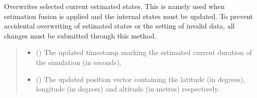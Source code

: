 \documentclass[letterpaper,10pt,english]{sphinxmanual}
\begin{document}
\begin{fulllineitems}
\begin{fulllineitems}
\label{\detokenize{modules/estimation/state:qnav.estimation.state.EstimatedState.update_estimates}}
\pysigstartsignatures
{}
\pysigstopsignatures
\sphinxAtStartPar
Overwrites selected current estimated states.
This is namely used when estimation fusion is applied and the
internal states must be updated. To prevent accidental overwriting of
estimated states or the setting of invalid data, all changes must be
submitted through this method.
\begin{quote}\begin{description}
\begin{itemize}
\item {} 
\sphinxAtStartPar
{} () \textendash{} The updated timestamp marking the estimated current
duration of the simulation (in seconds).

\item {} 
\sphinxAtStartPar
{} (\sphinxstyleliteralemphasis{\sphinxupquote{ (}}\sphinxstyleliteralemphasis{\sphinxupquote{)}}) \textendash{} The updated position vector containing the
latitude (in degrees), longitude (in degrees) and altitude
(in metres) respectively.


\end{itemize}
\end{description}
\end{quote}
\end{fulllineitems}
\end{fulllineitems}
\end{document}
